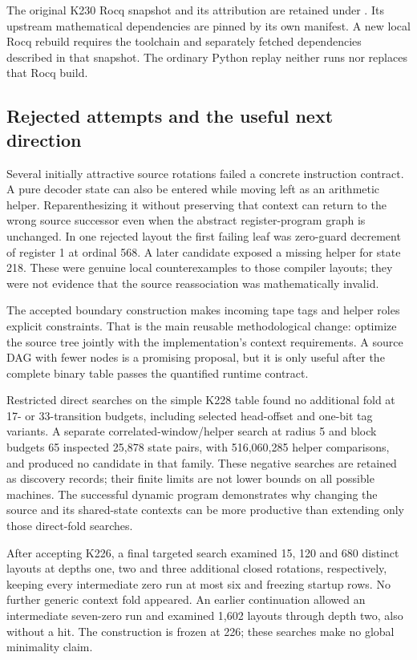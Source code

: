 \documentclass[11pt,a4paper]{article}
\newcommand{\artifact}[1]{\texttt{\detokenize{#1}}}
\begin{document}
The original K230 Rocq snapshot and its attribution are retained under
\artifact{vendor/k230-rocq}. Its upstream mathematical dependencies
are pinned by its own manifest. A new local Rocq rebuild requires the
toolchain and separately fetched dependencies described in that
snapshot. The ordinary Python replay neither runs nor replaces that
Rocq build.

\subsection{Rejected attempts and the useful next direction}

Several initially attractive source rotations failed a concrete
instruction contract. A pure decoder state can also be entered while
moving left as an arithmetic helper. Reparenthesizing it without
preserving that context can return to the wrong source successor even
when the abstract register-program graph is unchanged. In one rejected
layout the first failing leaf was zero-guard decrement of register 1
at ordinal 568. A later candidate exposed a missing helper for state
218. These were genuine local counterexamples to those compiler
layouts; they were not evidence that the source reassociation was
mathematically invalid.

The accepted boundary construction makes incoming tape tags and helper
roles explicit constraints. That is the main reusable methodological
change: optimize the source tree jointly with the implementation's
context requirements. A source DAG with fewer nodes is a promising
proposal, but it is only useful after the complete binary table passes
the quantified runtime contract.

Restricted direct searches on the simple K228 table found no additional
fold at 17- or 33-transition budgets, including selected head-offset
and one-bit tag variants. A separate correlated-window/helper search
at radius 5 and block budgets 65 inspected 25,878 state pairs, with
516,060,285 helper comparisons, and produced no candidate in that
family. These negative searches are retained as discovery records;
their finite limits are not lower bounds on all possible machines.
The successful dynamic program demonstrates why changing the source
and its shared-state contexts can be more productive than extending
only those direct-fold searches.

After accepting K226, a final targeted search examined 15, 120 and 680
distinct layouts at depths one, two and three additional closed
rotations, respectively, keeping every intermediate zero run at most
six and freezing startup rows. No further generic context fold appeared.
An earlier continuation allowed an intermediate seven-zero run and
examined 1,602 layouts through depth two, also without a hit. The
construction is frozen at 226; these searches make no global
minimality claim.
\end{document}
